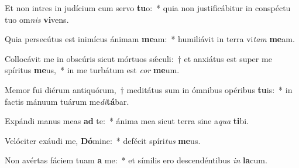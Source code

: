 \item Et non intres in judícium cum servo \textbf{tu}o:~* quia non justificábitur in conspéctu tuo om\textit{nis} \textbf{vi}vens.
\item Quia persecútus est inimícus ánimam \textbf{me}am:~* humiliávit in terra vi\textit{tam} \textbf{me}am.
\item Collocávit me in obscúris sicut mórtuos sǽculi:~† et anxiátus est super me spíritus \textbf{me}us,~* in me turbátum est \textit{cor} \textbf{me}um.
\item Memor fui diérum antiquórum,~† meditátus sum in ómnibus opéribus \textbf{tu}is:~* in factis mánuum tuárum me\textit{di}\textbf{tá}bar.
\item Expándi manus meas \textbf{ad} te:~* ánima mea sicut terra sine a\textit{qua} \textbf{ti}bi.
\item Velóciter exáudi me, \textbf{Dó}mine:~* defécit spíri\textit{tus} \textbf{me}us.
\item Non avértas fáciem tuam \textbf{a} me:~* et símilis ero descendéntibus \textit{in} \textbf{la}cum.
